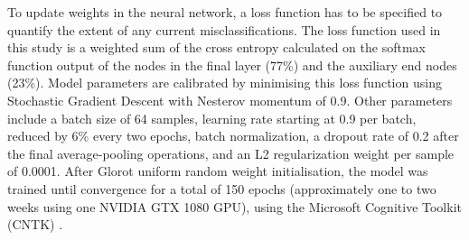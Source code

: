 \documentclass[10pt,letterpaper]{article}
\begin{document}

To update weights in the neural network, a loss function has to be specified to quantify the extent of any current misclassifications. The loss function used in this study is a weighted sum of the cross entropy calculated on the softmax function output of the nodes in the final layer (77\%) and the auxiliary end nodes (23\%). Model parameters are calibrated by minimising this loss function using Stochastic Gradient Descent with Nesterov momentum of 0.9. Other parameters include a batch size of 64 samples, learning rate starting at 0.9 per batch, reduced by 6\% every two epochs, batch normalization, a dropout rate of 0.2 after the final average-pooling operations, and an L2 regularization weight per sample of 0.0001. After Glorot uniform random weight initialisation, the model was trained until convergence for a total of 150 epochs (approximately one to two weeks using one NVIDIA GTX 1080 GPU), using the Microsoft Cognitive Toolkit (CNTK) \cite{Yu2015}. 
\end{document}
